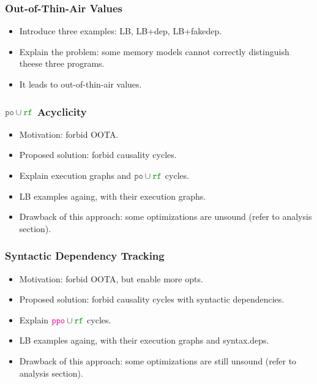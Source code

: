 \subsubsection{Out-of-Thin-Air Values}
\label{sec:background:oota}

\begin{itemize}
  \item Introduce three examples: LB, LB+dep, LB+fakedep.
  \item Explain the problem: some memory models cannot 
    correctly distinguish theese three programs.
  \item It leads to out-of-thin-air values.
\end{itemize}



\subsubsection{$\lPO\cup\lRF$ Acyclicity}

\begin{itemize}
  \item Motivation: forbid OOTA.
  \item Proposed solution: forbid causality cycles. 
  \item Explain execution graphs and $\lPO\cup\lRF$ cycles.
  \item LB examples againg, with their execution graphs.
  \item Drawback of this approach: some optimizations are unsound 
    (refer to analysis section).
\end{itemize}

\subsubsection{Syntactic Dependency Tracking}

\begin{itemize}
  \item Motivation: forbid OOTA, but enable more opts.
  \item Proposed solution: forbid causality cycles with syntactic dependencies. 
  \item Explain $\lPPO\cup\lRF$ cycles.
  \item LB examples againg, with their execution graphs and syntax.deps.
  \item Drawback of this approach: some optimizations are still unsound 
    (refer to analysis section).
\end{itemize}

